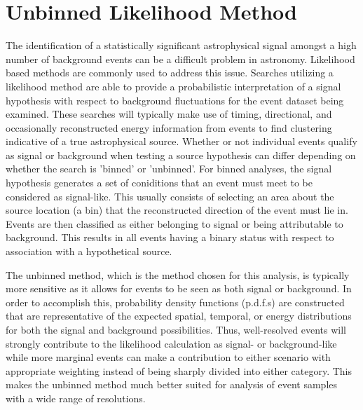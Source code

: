 \documentclass{gatech-thesis}
\begin{document}
\section{Unbinned Likelihood Method}
The identification of a statistically significant astrophysical signal amongst a high number of background events can be a difficult problem in astronomy. Likelihood based methods are commonly used to address this issue. Searches utilizing a likelihood method are able to provide a probabilistic interpretation of a signal hypothesis with respect to background fluctuations for the event dataset being examined. These searches will typically make use of timing, directional, and occasionally reconstructed energy information from events to find clustering indicative of a true astrophysical source. Whether or not individual events qualify as signal or background when testing a source hypothesis can differ depending on whether the search is 'binned' or 'unbinned'. For binned analyses, the signal hypothesis generates a set of coniditions that an event must meet to be considered as signal-like. This usually consists of selecting an area about the source location (a bin) that the reconstructed direction of the event must lie in. Events are then classified as either belonging to signal or being attributable to background. This results in all events having a binary status with respect to association with a hypothetical source. 

The unbinned method, which is the method chosen for this analysis, is typically more sensitive as it allows for events to be seen as both signal or background. In order to accomplish this, probability density functions (p.d.f.s) are constructed that are representative of the expected spatial, temporal, or energy distributions for both the signal and background possibilities. Thus, well-resolved events will strongly contribute to the likelihood calculation as signal- or background-like while more marginal events can make a contribution to either scenario with appropriate weighting instead of being sharply divided into either category. This makes the unbinned method much better suited for analysis of event samples with a wide range of resolutions.
\end{document}
